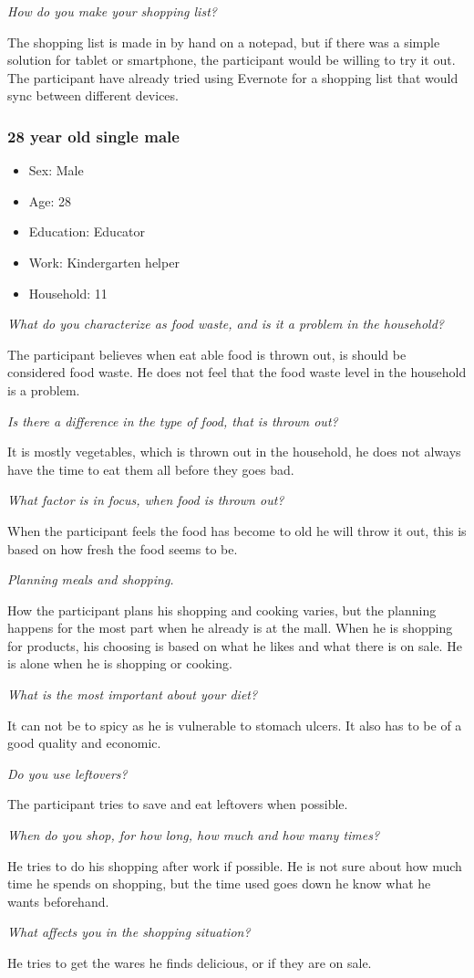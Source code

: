 \emph{How do you make your shopping list?}

The shopping list is made in by hand on a notepad, but if there was a simple solution for tablet or smartphone, the participant would be willing to try it out. The participant have already tried using Evernote for a shopping list that would sync between different devices.
\subsubsection{28 year old single male}
\begin{itemize}
  \item Sex: Male
  \item Age: 28
  \item Education: Educator
  \item Work: Kindergarten helper
  \item Household: 11
\end{itemize}
\emph{What do you characterize as food waste, and is it a problem in the household?}

The participant believes when eat able food is thrown out, is should be considered food waste. He does not feel that the food waste level in the household is a problem.

\emph{Is there a difference in the type of food, that is thrown out?}

It is mostly vegetables, which is thrown out in the household, he does not always have the time to eat them all before they goes bad.

\emph{What factor is in focus, when food is thrown out?}

When the participant feels the food has become to old he will throw it out, this is based on how fresh the food seems to be.

\emph{Planning meals and shopping.}

How the participant plans his shopping and cooking varies, but the planning happens for the most part when he already is at the mall. When he is shopping for products, his choosing is based on what he likes and what there is on sale. He is alone when he is shopping or cooking.

\emph{What is the most important about your diet?}

It can not be to spicy as he is vulnerable to stomach ulcers. It also has to be of a good quality and economic.

\emph{Do you use leftovers?}

The participant tries to save and eat leftovers when possible.

\emph{When do you shop, for how long, how much and how many times?}

He tries to do his shopping after work if possible. He is not sure about how much time he spends on shopping, but the time used goes down he know what he wants beforehand.

\emph{What affects you in the shopping situation?}

He tries to get the wares he finds delicious, or if they are on sale.